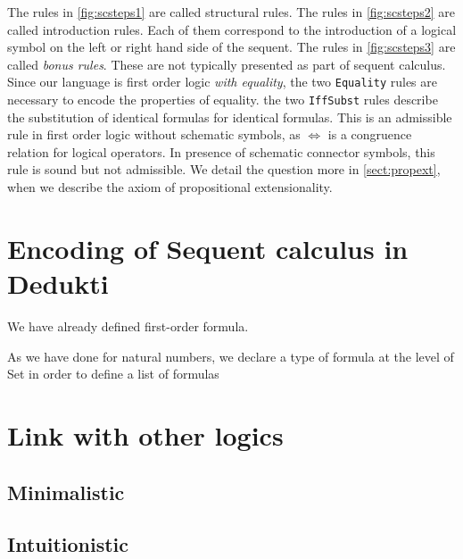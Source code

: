 \documentclass{article}
\begin{document}
	The rules in \autoref{fig:scsteps1} are called structural rules. The rules in \autoref{fig:scsteps2} are called introduction rules. Each of them correspond to the introduction of a logical symbol on the left or right hand side of the sequent.
	The rules in \autoref{fig:scsteps3} are called \textit{bonus rules}. These are not typically presented as part of sequent calculus. Since our language is first order logic \textit{with equality}, the two \texttt{Equality} rules are necessary to encode the properties of equality. the two \texttt{IffSubst} rules describe the substitution of identical formulas for identical formulas. This is an admissible rule in first order logic without schematic symbols, as $\iff$ is a congruence relation for logical operators. In presence of schematic connector symbols, this rule is sound but not admissible. We detail the question more in \autoref{sect:propext}, when we describe the axiom of propositional extensionality.
	
\newpage
	
	\section{Encoding of Sequent calculus in Dedukti}
	
	We have already defined first-order formula.
	
	As we have done for natural numbers, we declare a type of formula at the level of Set in order to define a list of formulas
	
	
	
	
	
	
	
	
	
	
	
	\section{Link with other logics}
	
	\subsection{Minimalistic}
	
	\subsection{Intuitionistic}
	
\end{document}
